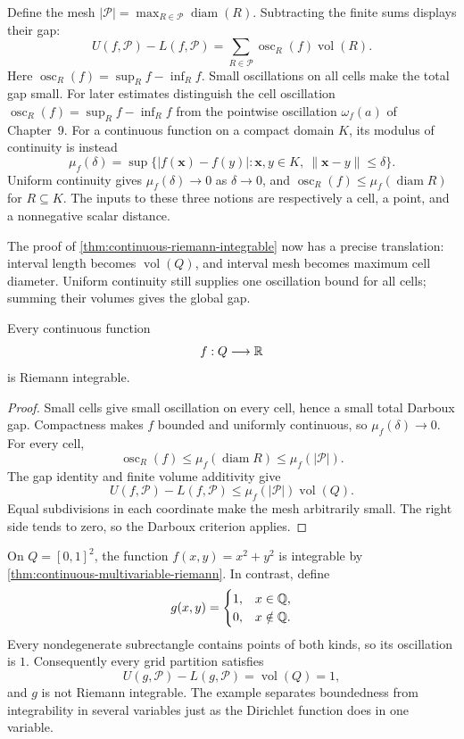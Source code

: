 Define the mesh $|\mathcal P|=\max_{R\in\mathcal P}\operatorname{diam}(R)$.
Subtracting the finite sums displays their gap:
\[
\boxed{U(f,\mathcal P)-L(f,\mathcal P)
=\sum_{R\in\mathcal P}\operatorname{osc}_R(f)\operatorname{vol}(R).}
\]
Here $\operatorname{osc}_R(f)=\sup_R f-\inf_R f$. Small oscillations on
all cells make the total gap small.
For later estimates distinguish the cell oscillation
$\operatorname{osc}_R(f)=\sup_R f-\inf_R f$ from the pointwise
oscillation $\omega_f(a)$ of Chapter~9. For a continuous function on a
compact domain $K$, its modulus of continuity is instead
\[
\mu_f(\delta)=\sup\{|f(\mathbf{x})-f(y)|:\mathbf{x},y\in K,\ \|\mathbf{x}-y\|\leq\delta\}.
\]
Uniform continuity gives $\mu_f(\delta)\to0$ as $\delta\to0$, and
$\operatorname{osc}_R(f)\leq\mu_f(\operatorname{diam}R)$ for $R\subseteq K$.
The inputs to these three notions are respectively a cell, a point, and a
nonnegative scalar distance.

The proof of \cref{thm:continuous-riemann-integrable} now has a precise
translation: interval length becomes $\operatorname{vol}(Q)$, and interval
mesh becomes maximum cell diameter. Uniform continuity still supplies one
oscillation bound for all cells; summing their volumes gives the global gap.
\begin{theorem}
\label{thm:continuous-multivariable-riemann}
Every continuous function
\[
f:Q\longrightarrow\mathbb{R}
\]
is Riemann integrable.
\end{theorem}
\begin{proof}
Small cells give small oscillation on every cell, hence
a small total Darboux gap. Compactness makes $f$ bounded and uniformly
continuous, so $\mu_f(\delta)\to0$. For every cell,
\[
\operatorname{osc}_R(f)\leq\mu_f(\operatorname{diam}R)\leq\mu_f(|\mathcal P|).
\]
The gap identity and finite volume additivity give
\[
U(f,\mathcal P)-L(f,\mathcal P)\leq
\mu_f(|\mathcal P|)\operatorname{vol}(Q).
\]
Equal subdivisions in each coordinate make the mesh arbitrarily small.
The right side tends to zero, so the Darboux criterion applies.
\end{proof}

\begin{example}
On $Q=[0,1]^2$, the function $f(x,y)=x^2+y^2$ is integrable by
\cref{thm:continuous-multivariable-riemann}.  In contrast, define
\[
g(x,y)=\begin{cases}1,&x\in\mathbb{Q},\\0,&x\notin\mathbb{Q}.\end{cases}
\]
Every nondegenerate subrectangle contains points of both kinds, so its
oscillation is $1$.  Consequently every grid partition satisfies
\[
U(g,\mathcal P)-L(g,\mathcal P)=\operatorname{vol}(Q)=1,
\]
and $g$ is not Riemann integrable.  The example separates boundedness from
integrability in several variables just as the Dirichlet function does in
one variable.
\end{example}

